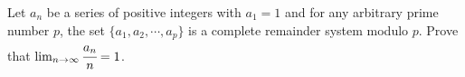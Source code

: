 Let $a_n$ be a series of positive integers with $a_1=1$ and for any arbitrary prime number $p$, the set $\{a_1,a_2,\cdots,a_p\}$ is a complete remainder system modulo $p$. Prove that $\lim_{n\rightarrow \infty} \cfrac{a_n}{n}=1$.